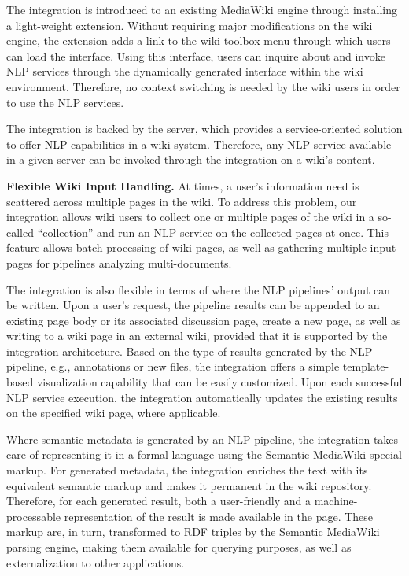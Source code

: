 \begin{description}
\item[Light-weight MediaWiki Extension.] The \wikinlp integration is introduced to an existing MediaWiki engine through installing a light-weight extension. Without requiring major modifications on the wiki engine, the extension adds a link to the wiki toolbox menu through which users can load the \wikinlp interface. Using this interface, users can inquire about and invoke NLP services through the dynamically generated \wikinlp interface within the wiki environment. Therefore, no context switching is needed by the wiki users in order to use the NLP services.
\item[NLP Pipeline Independent Architecture.] The \wikinlp integration is backed by the \sa server, which provides a service-oriented solution to offer NLP capabilities in a wiki system. Therefore, any NLP service available in a given \sa server can be invoked through the \wikinlp integration on a wiki's content.
\item\textbf{Flexible Wiki Input Handling.} At times, a user's information need is scattered across multiple pages in the wiki. To address this problem, our \wikinlp integration allows wiki users to collect one or multiple pages of the wiki in a so-called ``collection'' and run an NLP service on the collected pages at once. This feature allows batch-processing of wiki pages, as well as gathering multiple input pages for pipelines analyzing multi-documents.
\item[Flexible NLP Result Handling.] The \wikinlp integration is also flexible in terms of where the NLP pipelines' output can be written. Upon a user's request, the pipeline results can be appended to an existing page body or its associated discussion page, create a new page, as well as writing to a wiki page in an external wiki, provided that it is supported by the \wikinlp integration architecture. Based on the type of results generated by the NLP pipeline, e.g., annotations or new files, the \wikinlp integration offers a simple template-based visualization capability that can be easily customized. Upon each successful NLP service execution, the \wikinlp integration automatically updates the existing results on the specified wiki page, where applicable.
\item[Semantic Markup Generation.] Where semantic metadata is generated by an NLP pipeline, the \wikinlp integration takes care of representing it in a formal language using the Semantic MediaWiki special markup. For generated metadata, the \wikinlp integration enriches the text with its equivalent semantic markup and makes it permanent in the wiki repository. Therefore, for each generated result, both a user-friendly and a machine-processable representation of the result is made available in the page. These markup are, in turn, transformed to RDF triples by the Semantic MediaWiki parsing engine, making them available for querying purposes, as well as externalization to other applications.


\end{description}
